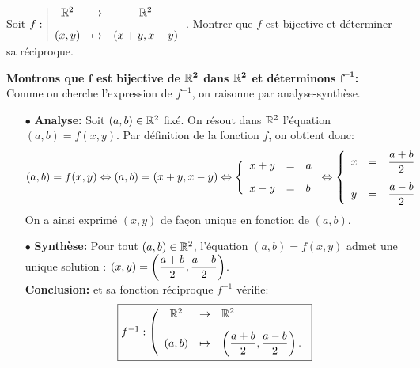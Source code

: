 \documentclass[a4paper, 11pt,reqno]{article}
\begin{document}

\begin{exercice}  \;
	Soit $f:\left|\begin{array}{ccc} \R^2&\rightarrow& \R^2 \vsec\\ (x,y) & \mapsto & (x+y,x-y) \end{array}\right.$. Montrer que $f$ est bijective et d\'eterminer sa r\'eciproque.
\end{exercice}
\begin{correction} \;
	\textbf{Montrons que $\mathbf{f}$ est bijective de $\mathbf{\mathbb{R}^2}$ dans $\mathbf{\mathbb{R}^2}$ et d\'eterminons $\mathbf{f^{-1}}$:}\\
	\noindent Comme on cherche l'expression de $f^{-1}$, on raisonne par analyse-synth\`{e}se.
	\begin{itemize}
		\item[$\bullet$] \textbf{Analyse:} Soit $(a,b)\in\mathbb{R}^2$ fix\'e. On r\'esout dans $\mathbb{R}^2$ l'\'equation $(a,b)=f(x,y)$. Par d\'efinition de la fonction $f$, on obtient donc:
			$$(a,b)=f(x,y)\Leftrightarrow (a,b)=(x+y,x-y)
				\Leftrightarrow\left\lbrace \begin{array}{lll} x+y&=&a\vsec\\ x-y&=&b   \end{array}\right.
				\Leftrightarrow\left\lbrace \begin{array}{lll} x&=&\ddp\frac{a+b}{2}\vsec\\ y&=&\ddp\frac{a-b}{2}  \end{array}\right.$$
			On a ainsi exprim\'e $(x,y)$ de fa\c con unique en fonction de $(a,b)$.
		\item[$\bullet$] \textbf{Synth\`{e}se:} Pour tout $(a,b)\in\mathbb{R}^2$, l'\'equation $(a,b)=f(x,y)$ admet une unique solution : $(x,y)=\left( \displaystyle\frac{a+b}{2},\displaystyle\frac{a-b}{2} \right)$. \\
			\textbf{Conclusion:}  et sa fonction r\'eciproque $f^{-1}$ v\'erifie:
			$$\fbox{$f^{-1}:\left( \begin{array}{cll}
							\R^2  & \rightarrow & \R^2\vsec                                            \\
							(a,b) & \mapsto     & \left( \ddp\frac{a+b}{2},\ddp\frac{a-b}{2} \right) .
						\end{array} \right.$}$$
	\end{itemize}
\end{correction}
\end{document}
